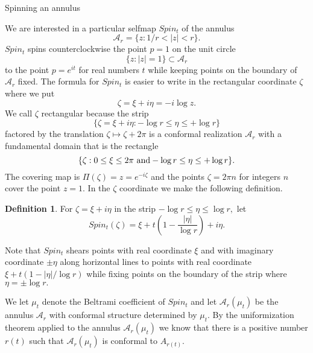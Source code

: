 \documentclass[12pt]{amsart}
\theoremstyle{remark}
\theoremstyle{definition}
\newtheorem{definition}{Definition}
\theoremstyle{definition}
\begin{document}
\begin{section}{Spinning an annulus}\label{s5}

We  are interested in a particular selfmap $Spin_t$ of the annulus 
$${\mathcal A}_r=\{z: 1/r<|z|<r\}.$$ $Spin_t$ spins counterclockwise the point  $p=1$ on the unit circle
$$\{z: |z|=1\} \subset {\mathcal A}_r$$ to the point $p=e^{i t}$ for real numbers $t$ while keeping points on the boundary of ${\mathcal A}_r$ fixed.   The formula for $Spin_t$ is easier to write 
in the rectangular coordinate $\zeta$ where we put 
$$\zeta = \xi + i \eta  = -i \log z.$$
We call $\zeta$ rectangular because the strip 
\begin{equation}\label{strip1}
\{\zeta=\xi+i\eta:-\log r \leq \eta \leq +\log r\}
\end{equation}
 factored by the translation $\zeta \mapsto \zeta + 2 \pi$ is a conformal realization ${\mathcal A}_r$ with a fundamental domain that is the rectangle 
$$\{\zeta:0 \leq \xi \leq 2 \pi {\rm \ and  } -\log r \leq \eta \leq +\log r  \}.$$
The covering map is $\Pi(\zeta)=z=e^{-i\zeta}$  and the points $\zeta=2 \pi n$ for integers $n$ cover the point $z=1.$
In the $\zeta$ coordinate we make the following definition.

  \begin{definition}\label{spin}    For $\zeta = \xi +i \eta$ in the strip $-\log r \leq \eta \leq \log r,$ let 
  \begin{equation}\label{inv}Spin_t(\zeta) = \xi + t \left(1-\frac{|\eta|}{\log r}\right)+ i \eta.
  \end{equation} 
  \end{definition}

Note that  $Spin_t$ shears points with real coordinate $\xi$ and with imaginary coordinate $\pm \eta$ along horizontal lines to points with real coordinate $\xi + t(1-|\eta|/\log r)$ while fixing points on the boundary of the strip where $\eta=\pm \log r.$


We let $\mu_t$ denote 
the Beltrami coefficient of $Spin_t$
and let ${\mathcal A}_r(\mu_t)$ be the annulus ${\mathcal A}_r$ with conformal structure determined by 
 $\mu_t.$ 
By the uniformization theorem applied to the annulus ${\mathcal A}_r(\mu_t)$ we know that there is a positive number $r(t)$ such that ${\mathcal A}_r(\mu_t)$ is conformal to $A_{r(t)}.$



\end{section}
\end{document}
